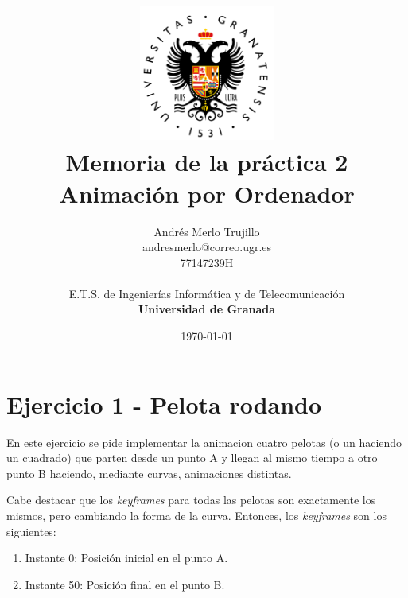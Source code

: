 \documentclass{article}
\title{
\includegraphics[width=1.75in]{imagenes/UGR-Logo.png} \\
\vspace*{1in}
\textbf{Memoria de la práctica 2} \\
Animación por Ordenador \\
\vspace*{0.5in}}
\author{Andrés Merlo Trujillo \\
andresmerlo@correo.ugr.es \\
77147239H \\ 
\vspace*{0.5in} \\
E.T.S. de Ingenierías Informática y de Telecomunicación \\
\textbf{Universidad de Granada}} \date{\today}
\begin{document}
\begin{titlingpage}
\maketitle
\end{titlingpage}

\tableofcontents

\newpage

\pagestyle{fancy}   %

\section{Ejercicio 1 - Pelota rodando}

En este ejercicio se pide implementar la animacion cuatro pelotas (o un haciendo un cuadrado) que parten desde un punto A y llegan al mismo tiempo a otro punto B haciendo, mediante curvas, animaciones distintas.

\bigskip

Cabe destacar que los \textit{keyframes} para todas las pelotas son exactamente los mismos, pero cambiando la forma de la curva. Entonces, los \textit{keyframes} son los siguientes:

\begin{enumerate}
    \item Instante 0: Posición inicial en el punto A.
    \item Instante 50: Posición final en el punto B.
\end{enumerate}
\end{document}
